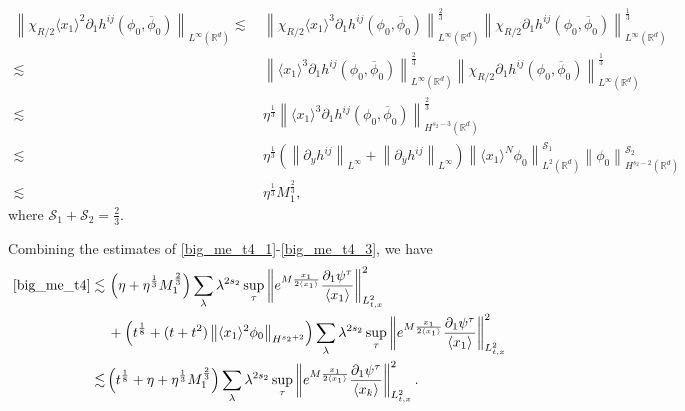 \documentclass[10pt,twoside,a4paper]{article}
\numberwithin{equation}{section}\allowdisplaybreaks
\begin{document}
\begin{align*}
	\left\| \chi_{R/2} \langle x_1\rangle^2   \partial_1 h^{ij} (\phi_0,\overline{\phi}_0)  \right\|_{L^\infty (\mathbb{R}^d)} \lesssim& \,  	\left\| \chi_{R/2} \langle x_1\rangle^3   \partial_1 h^{ij} (\phi_0,\overline{\phi}_0)  \right\|_{L^\infty (\mathbb{R}^d)}^{\frac 23}\left\| \chi_{R/2}   \partial_1 h^{ij} (\phi_0,\overline{\phi}_0)  \right\|_{L^\infty (\mathbb{R}^d)}^{\frac 13} \\
	\lesssim&  \,	\left\| \langle x_1\rangle^3   \partial_1 h^{ij} (\phi_0,\overline{\phi}_0)  \right\|_{L^\infty (\mathbb{R}^d)}^{\frac 23 } \left\| \chi_{R/2}   \partial_1 h^{ij} (\phi_0,\overline{\phi}_0)  \right\|_{L^\infty (\mathbb{R}^d)}^{\frac 13} \\
	\lesssim&  \,\eta^{\frac 13} 	\left\| \langle x_1\rangle^3   \partial_1 h^{ij} (\phi_0,\overline{\phi}_0)  \right\|_{H^{s_2-3} (\mathbb{R}^d)}^{\frac 23 }\\
	\lesssim&  \,\eta^{\frac 13} \left( \left\|\partial_y h^{ij}\right\|_{L^\infty}+ \left\|\partial_{\overline{y}} h^{ij}\right\|_{L^\infty}\right) \left\| \langle x_1\rangle^N   \phi_0  \right\|_{L^{2} (\mathbb{R}^d)}^{\mathscr{S}_1}	\left\|  \phi_0  \right\|_{H^{s_2-2} (\mathbb{R}^d)}^{\mathscr{S}_2}\\
	\lesssim & \, \eta^{\frac 13}  M_1^{\frac 23 },
\end{align*}
where $ \mathscr{S}_1+\mathscr{S}_2=\frac 23 $.

Combining the estimates of \eqref{big_me_t4_1}-\eqref{big_me_t4_3}, we have
\begin{align*}
	\eqref{big_me_t4} \lesssim &\,  \left(\eta+  \eta^{\frac 13}  M_1^{\frac 23 }\right)   \sum_{\lambda} \lambda^{ 2s_2} \sup_{\tau} \left\| e^{M \frac{x_1}{2\langle x_1\rangle} } \frac{\partial_1 \psi^\tau }{\langle x_1\rangle }  \right\|_{L^2_{t,x}}^2\nonumber\\
	&\,+  \left( t^{\frac 18}+(t+t^2) \left\| \langle x_1 \rangle^2  \phi_0\right\|_{H^{s_2+2}}\right)   \sum_{\lambda} \lambda^{ 2s_2} \sup_{\tau} \left\| e^{M \frac{x_1}{2\langle x_1\rangle} } \frac{\partial_1 \psi^\tau }{\langle x_1\rangle }  \right\|_{L^2_{t,x}}^2\\
	\lesssim &  \left( t^{\frac 18}+ \eta+  \eta^{\frac 13}  M_1^{\frac 23 }\right) \sum_{\lambda} \lambda^{ 2s_2}\sup_{\tau} \left\| e^{M \frac{x_1}{2\langle x_1\rangle} } \frac{\partial_1 \psi^\tau }{\langle x_k\rangle }  \right\|_{L^2_{t,x}}^2. 
\end{align*}
\end{document}
